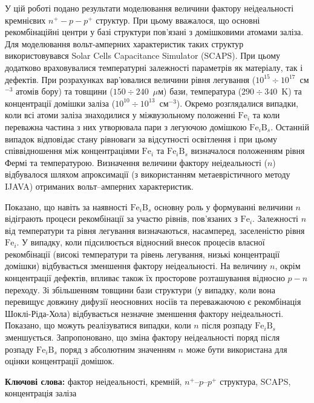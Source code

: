 \documentclass[12pt]{article}
\begin{document}
У цій роботі подано результати моделювання величини фактору не\-ідеально\-сті кремнієвих $n^+-p-p^+$ структур.
При цьому вважалося, що основні реком\-бі\-на\-цій\-ні центри у базі структури пов'язані з домішковими атомами заліза.
Для моде\-лю\-вання вольт-амперних характеристик таких структур використовувався Solar Cells Capacitance Simulator (SCAPS).
При цьому додатково враховувалися температурні залежності параметрів як матеріалу, так і дефектів.
При роз\-ра\-хун\-ках вар'ювалися величини рівня легування ($10^{15}\div10^{17}$~см$^{-3}$ атомів бору) та товщини ($150\div240$~$\mu$м) бази,
температура ($290\div340$~K) та концентрації домішки заліза ($10^{10}\div10^{13}$~см$^{-3}$).
Окремо розглядалися випадки, коли всі атоми заліза знаходилися у міжвузольному положенні $\mathrm{Fe}_i$ та
коли переважна частина з них утворювала пари з легуючою домішкою $\mathrm{Fe}_i\mathrm{B}_s$.
Останній випадок відповідає стану рівноваги за відсутності освітлення і при цьому
співвідношення між концентраціями  $\mathrm{Fe}_i$ та $\mathrm{Fe}_i\mathrm{B}_s$ визначалося положенням
рівня Фермі та тем\-пе\-ра\-ту\-рою.
Визначення величини фактору неідеальності ($n$) відбувалося шляхом апроксимації (з використанням
метаеврістичного методу IJAVA) отриманих во\-льт--ам\-пер\-них характеристик.

Показано, що навіть за наявності $\mathrm{Fe}_i\mathrm{B}_s$ основну роль у формуванні величини $n$
відіграють процеси рекомбінації за участю рівнів, пов'язаних з $\mathrm{Fe}_i$.
Залежності $n$ від температури та рівня легування визначаються, насамперед,
заселеністю рівня $\mathrm{Fe}_i$.
У випадку, коли підсилюється відносний внесок процесів власної рекомбінації (високі
температури та рівень легування, низькі концентрації до\-міш\-ки) відбувається зменшення фактору неідеальності.
На величину $n$, окрім концентрації дефектів, впливає також їх просторове розташування відносно $p-n$ переходу.
Зі збільшенням товщини бази структури (у випадку, коли вона перевищує довжину дифузії неосновних носіїв та
переважаючою є рекомбінація Шоклі-Ріда-Хола) відбувається незначне зменшення фактору неідеальності.
По\-ка\-за\-но, що можуть реалізуватися випадки, коли $n$ після розпаду $\mathrm{Fe}_i\mathrm{B}_s$ змен\-шуєть\-ся.
Запропоновано, що зміна фактору неідеальності поряд після розпаду $\mathrm{Fe}_i\mathrm{B}_s$ поряд з абсолютним значенням $n$  може бути використана
для оцінки концентрації домішок.


\textbf{Ключові слова:}
фактор неідеальності, кремній, $n^+$--$p$--$p^+$ структура, SCAPS, концентрація заліза
\end{document}
